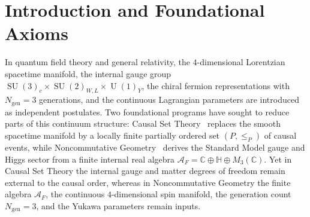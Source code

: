 \documentclass[11pt,a4paper]{article}
\theoremstyle{definition}
\theoremstyle{remark}
\newcommand{\R}{\mathbb{R}}
\newcommand{\C}{\mathbb{C}}
\newcommand{\quat}{\mathbb{H}}
\newcommand{\SU}{\operatorname{SU}}
\newcommand{\U}{\operatorname{U}}
\newcommand{\Gstar}{G_\star}
\begin{document}
\begin{abstract}
From discrete group-algebraic invariants and selection rules, the Plancherel expansion and Wedderburn decomposition of $\R[\Gstar]$ select vertex coordination degree $d = 4$ ($m = n = 4$), generate unitary quantum phase evolution $\exp(-iHt/\hbar)$ with exact non-supersymmetric Bose--Fermi supertrace balance, enforce $N_{\mathrm{gen}} = 3$ fermion generations and all-orders proton stability ($p \to e^+\pi^0 = 0$) while permitting $\Delta B = \Delta L = 3$ sphaleron baryogenesis, and accommodate $\bar{\theta}_{\mathrm{QCD}}^{\mathrm{tree}} = 0$ with non-vanishing CKM CP violation ($J_{\mathrm{CP}} = 2.93 \times 10^{-5}$) on the Hermitian subspace of $\R[\Delta(27)_f]$. Using the $Z$-boson mass $M_Z$ as the sole dimensionful unit anchor, the algebra reproduces the qualitative structure and leading-order magnitudes of 35 fundamental observables across 162 orders of magnitude---including $\alpha_{\mathrm{em}}^{-1}(M_Z) = 127.941$ ($\alpha_{\mathrm{em}}^{-1}(0) = 137.026$ with standard low-energy QED running), $\sin^2\theta_W(M_Z) = 0.23111$, $\alpha_s(M_Z) = 0.1170$, $\alpha_G(m_p) = 5.838 \times 10^{-39}$, $m_{h^0} = 125.10\text{ GeV}$, the charged-lepton, quark, and Dirac neutrino mass spectra and CKM/PMNS mixing matrices, a $2.462\text{ TeV}$ weak-triplet WIMP dark matter candidate ($\Omega_{\mathrm{DM}} h^2 = 0.1190$) co-located with a heavy Type-II 2HDM Higgs quartet, the baryon asymmetry $\eta_B = 6.125 \times 10^{-10}$, and the dark energy scale $E_\Lambda = 2.299\text{ meV}$.
\end{abstract}

\newpage
\setcounter{tocdepth}{1}
\tableofcontents

\section{Introduction and Foundational Axioms}

In quantum field theory and general relativity, the $4$-dimensional Lorentzian spacetime manifold, the internal gauge group $\SU(3)_c \times \SU(2)_{W,L} \times \U(1)_Y$, the chiral fermion representations with $N_{\mathrm{gen}} = 3$ generations, and the continuous Lagrangian parameters are introduced as independent postulates. Two foundational programs have sought to reduce parts of this continuum structure: Causal Set Theory~\cite{Bombelli1987} replaces the smooth spacetime manifold by a locally finite partially ordered set $(P, \le_P)$ of causal events, while Noncommutative Geometry~\cite{ChamseddineConnes1997} derives the Standard Model gauge and Higgs sector from a finite internal real algebra $\mathcal{A}_F = \C \oplus \quat \oplus M_3(\C)$. Yet in Causal Set Theory the internal gauge and matter degrees of freedom remain external to the causal order, whereas in Noncommutative Geometry the finite algebra $\mathcal{A}_F$, the continuous $4$-dimensional spin manifold, the generation count $N_{\mathrm{gen}} = 3$, and the Yukawa parameters remain inputs.
\end{document}
